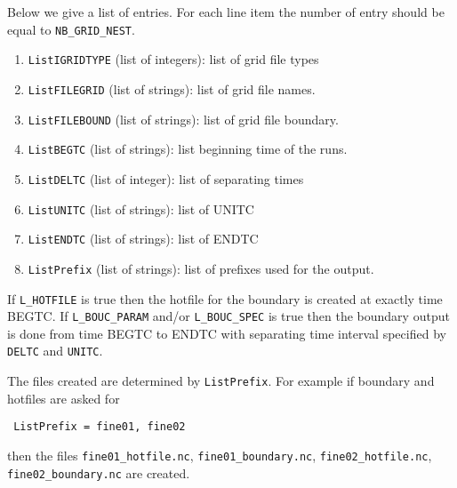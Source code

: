 \documentclass[12pt]{amsart}
\begin{document}
Below we give a list of entries. For each line item the number of entry should be equal to {\tt NB\_GRID\_NEST}.
\begin{enumerate}
\item {\tt ListIGRIDTYPE} (list of integers): list of grid file types
\item {\tt ListFILEGRID} (list of strings): list of grid file names.
\item {\tt ListFILEBOUND} (list of strings): list of grid file boundary.
\item {\tt ListBEGTC} (list of strings): list beginning time of the runs.
\item {\tt ListDELTC} (list of integer): list of separating times
\item {\tt ListUNITC} (list of strings): list of UNITC
\item {\tt ListENDTC} (list of strings): list of ENDTC
\item {\tt ListPrefix} (list of strings): list of prefixes used for the output.
\end{enumerate}
If {\tt L\_HOTFILE} is true then the hotfile for the boundary is created at exactly time BEGTC.
If {\tt L\_BOUC\_PARAM} and/or {\tt L\_BOUC\_SPEC} is true then the boundary output is done from time BEGTC to ENDTC with separating time interval specified by {\tt DELTC} and {\tt UNITC}.

The files created are determined by {\tt ListPrefix}. For example if boundary and hotfiles are asked for
\begin{verbatim}
 ListPrefix = fine01, fine02
\end{verbatim}
then the files {\tt fine01\_hotfile.nc}, {\tt fine01\_boundary.nc}, {\tt fine02\_hotfile.nc}, {\tt fine02\_boundary.nc} are created.
\end{document}
